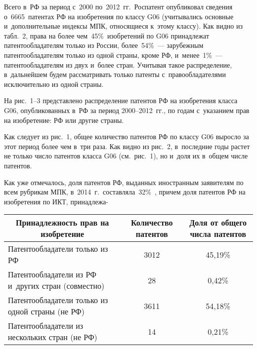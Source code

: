 \begin{multicols}{2}
  Всего в~РФ за период с~2000 по~2012~гг.\ Роспатент опубликовал сведения 
о~6665~патентах РФ на изобретения по классу G06 (учитывались основные 
и~дополнительные индексы МПК, относящиеся к~этому классу). Как видно из 
табл.~2, права на более чем~45\%~изобретений по G06 принадлежат 
патентообладателям только из России, более~54\%~--- зарубежным 
патентообладателям только из одной страны, кроме РФ, и~менее~1\%~--- 
патентообладателям из двух и~более стран. Учитывая такое распределение, 
в~дальнейшем будем рассматривать только патенты с~правообладателями 
исключительно из одной страны.


  На рис.~1--3 представлено распределение патентов РФ на изобретения класса 
G06, опубликованных в~РФ за период 2000--2012~гг., по годам с~указанием прав 
на изобретение: РФ или другие страны. 

    
     Как следует из рис.~1, общее количество патентов РФ по классу G06 
выросло за этот период более чем в~три раза. Как видно из рис.~2, в~последние 
годы растет не только число патентов класса G06 (см.\ рис.~1), но и~доля их в~общем 
числе патентов.
     
      
  Как уже отмечалось, доля патентов РФ, выданных иностранным заявителям по 
всем рубрикам МПК, в~2014~г.\ составляла~32\%~\cite{28-min}, причем доля 
патентов РФ на изобретения по ИКТ, принадлежа- %

\end{multicols}

\begin{table*}[h]\small %
\begin{center}
     \vspace*{2ex}
     
     \begin{tabular}{|l|c|c|}
     \hline
\multicolumn{1}{|c|}{Принадлежность прав на изобретение}&Количество
патентов&Доля от общего числа патентов\\
\hline
Патентообладатели только из РФ&3012&45,19\%\\
Патентообладатели из РФ и~других стран (совместно)&\hphantom{99}28&\hphantom{9}0,42\%\\
Патентообладатели только из одной страны (не РФ)&3611&54,18\%\\
Патентообладатели из нескольких стран (не РФ)&\hphantom{99}14&\hphantom{9}0,21\%\\
\hline
\end{tabular}
\end{center}
\vspace*{-12pt}
\end{table*}

